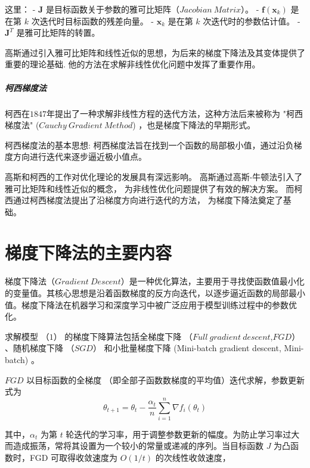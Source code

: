 \documentclass[printMode=false, declarePage=false]{ecnuthesis}
\begin{document}
    这里：
    - \(\mathbf{J}\) 是目标函数关于参数的雅可比矩阵（$Jacobian\ Matrix$）。
    - \(\mathbf{f}(\mathbf{x}_k)\) 是在第 \(k\) 次迭代时目标函数的残差向量。
    - \(\mathbf{x}_k\) 是在第 \(k\) 次迭代时的参数估计值。
    - \(\mathbf{J}^T\) 是雅可比矩阵的转置。

    高斯通过引入雅可比矩阵和线性近似的思想，为后来的梯度下降法及其变体提供了重要的理论基础.\cite{schraudolph2002fast}
    他的方法在求解非线性优化问题中发挥了重要作用。

    \paragraph{柯西梯度法}

    柯西在$1847$年提出了一种求解非线性方程的迭代方法，这种方法后来被称为 "柯西梯度法"  ($Cauchy\ Gradient\ 
    Method$) ，也是梯度下降法的早期形式。\cite{hassan2009new}

    柯西梯度法的基本思想:
    柯西梯度法旨在找到一个函数的局部极小值，通过沿负梯度方向进行迭代来逐步逼近极小值点。

    高斯和柯西的工作对优化理论的发展具有深远影响。
    高斯通过高斯-牛顿法引入了雅可比矩阵和线性近似的概念，
    为非线性优化问题提供了有效的解决方案。
    而柯西通过柯西梯度法提出了沿梯度方向进行迭代的方法，
    为梯度下降法奠定了基础。

    \chapter{梯度下降法的主要内容}

    梯度下降法（$Gradient\ Descent$）是一种优化算法，主要用于寻找使函数值最小化的变量值。其核心思想是沿着函数梯度的反方向迭代，以逐步逼近函数的局部最小值。梯度下降法在机器学习和深度学习中被广泛应用于模型训练过程中的参数优化。

    求解模型 （$1$） 的梯度下降算法包括全梯度下降 （$Full\ gradient\ descent$,$FGD$） \cite{becker1988improving}、随机梯度下降 （$SGD$） \cite{nesterov2013gradient} 和小批量梯度下降 (Mini-batch gradient descent, Mini-batch) \cite{hinton2012neural, li2014efficient}。

    $FGD$ 以目标函数的全梯度 （即全部子函数数梯度的平均值）迭代求解，参数更新式为
    \begin{equation}
    \theta_{t+1} = \theta_t - \frac{\alpha_t}{n} \sum_{i=1}^n \nabla f_i(\theta_t)
    \end{equation}

    其中，$\alpha_t$ 为第 $t$ 轮迭代的学习率，用于调整参数更新的幅度。为防止学习率过大而造成振荡，常将其设置为一个较小的常量或递减的序列。当目标函数 $J$ 为凸函数时，FGD 可取得收敛速度为 $O(1/t)$ 的次线性收敛速度，
\end{document}
